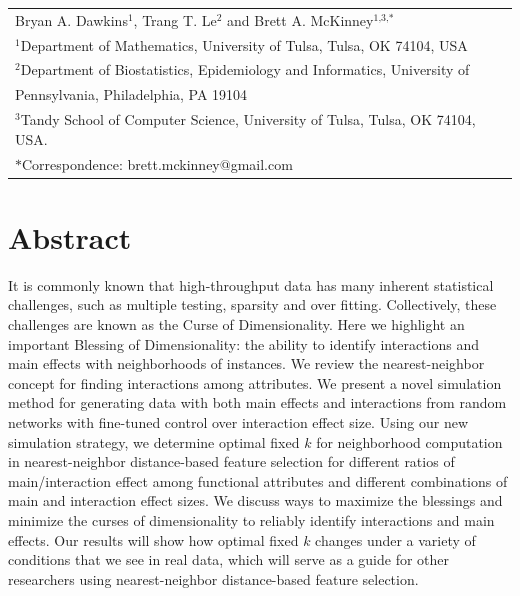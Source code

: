 \documentclass[10pt,letterpaper]{article}
\begin{document}
\vspace*{0.2in}

{\Large
\textbf{} %
}
\begin{center}
  \begin{tabular}{l}
  Bryan A. Dawkins$^{\text{1}}$, Trang T. Le$^{\text{2}}$ and Brett A. McKinney$^{\text{1,3,}*}$ \\
  $^{\text{1}}$Department of Mathematics, University of Tulsa, Tulsa, OK 74104, USA \\
  $^{\text{2}}$Department of Biostatistics, Epidemiology and Informatics, University of \\
  \hphantom{2}Pennsylvania, Philadelphia, PA 19104 \\
  $^{\text{3}}$Tandy School of Computer Science, University of Tulsa, Tulsa, OK 74104, USA. \\
  $*$Correspondence: brett.mckinney@gmail.com
  \end{tabular}
\end{center}


\section*{Abstract}
It is commonly known that high-throughput data has many inherent statistical challenges, such as multiple testing, sparsity and over fitting. Collectively, these challenges are known as the Curse of Dimensionality. Here we highlight an important Blessing of Dimensionality: the ability to identify interactions and main effects with neighborhoods of instances. We review the nearest-neighbor concept for finding interactions among attributes. We present a novel simulation method for generating data with both main effects and interactions from random networks with fine-tuned control over interaction effect size. Using our new simulation strategy, we determine optimal fixed $k$ for neighborhood computation in nearest-neighbor distance-based feature selection for different ratios of main/interaction effect among functional attributes and different combinations of main and interaction effect sizes. We discuss ways to maximize the blessings and minimize the curses of dimensionality to reliably identify interactions and main effects. Our results will show how optimal fixed $k$ changes under a variety of conditions that we see in real data, which will serve as a guide for other researchers using nearest-neighbor distance-based feature selection. 
\end{document}
